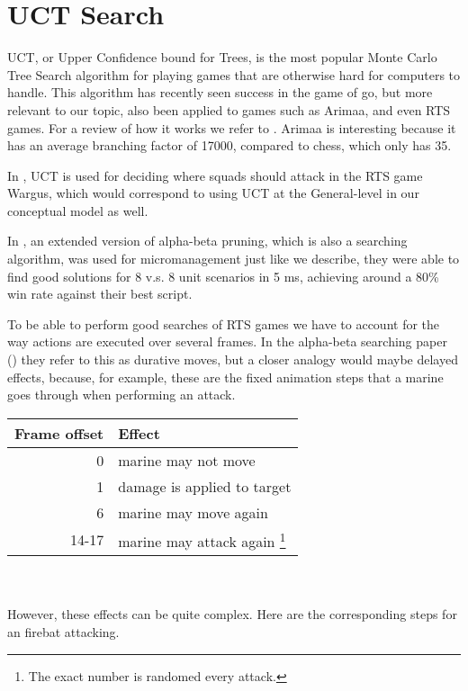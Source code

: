 \section{UCT Search}
UCT, or Upper Confidence bound for Trees, is the most popular Monte Carlo Tree Search algorithm for playing games that are otherwise hard for computers to handle.
This algorithm has recently seen success in the game of go, but more relevant to our topic, also been applied to games such as Arimaa, and even RTS games. For a review of how it works we refer to \cite{mcts}.
Arimaa is interesting because it has an average branching factor of 17000, compared to chess, which only has 35. \cite{arimaawiki}

In \cite{wargusuct}, UCT is used for deciding where squads should attack in the RTS game Wargus, which would correspond to using UCT at the General-level in our conceptual model as well.

In \cite{abcd}, an extended version of alpha-beta pruning, which is also a searching algorithm, was used for micromanagement just like we describe, they were able to find good solutions for 8 v.s. 8 unit scenarios in 5 ms, achieving around a 80\% win rate against their best script.



To be able to perform good searches of RTS games we have to account for the way actions are executed over several frames. In the alpha-beta searching paper (\cite{abcd}) they refer to this as durative moves, but a closer analogy would maybe delayed effects, because, for example, these are the fixed animation steps that a marine goes through when performing an attack.

\begin{center}
\begin{tabular}{ r | p{} }
Frame offset & Effect \\
\hline
0 & marine may not move \\
1 & damage is applied to target \\
6 & marine may move again \\
14-17 & marine may attack again
\footnote{The exact number is randomed every attack.}
\end{tabular}
\end{center}
\\ \\

However, these effects can be quite complex. Here are the corresponding steps for an firebat attacking.

